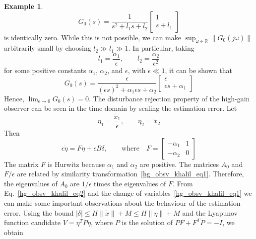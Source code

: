 \documentclass[11pt,a4paper,oneside]{book}
\numberwithin{equation}{section}
\theoremstyle{it}
\theoremstyle{definition}
\newtheorem{example}{Example}[section]
\begin{document}
\begin{example}
	\begin{equation*}
		G_0(s)=\frac{1}{s^2+l_1s+l_2}\begin{bmatrix} 1 \\[6pt] s + l_1 \end{bmatrix}
	\end{equation*} 
	is identically zero. While this is not possible, we can make $\sup_{\omega\in\mathbb{R}}\|G_0(j\omega)\|$ arbitrarily small by choosing $l_2\gg l_1\gg 1$. In particular, taking 
	\begin{equation*}
		l_1=\frac{\alpha_1}{\epsilon},\qquad l_2=\frac{\alpha_2}{\epsilon^2}
	\end{equation*}
	for some positive constants $\alpha_1$, $\alpha_2$, and $\epsilon$, with $\epsilon\ll 1$, it can be shown that 
	\begin{equation*}
		G_0(s)=\frac{\epsilon}{(\epsilon s)^2+\alpha_1\epsilon s +\alpha_2}\begin{bmatrix} \epsilon \\[6pt] \epsilon s + \alpha_1 \end{bmatrix}
	\end{equation*}
	Hence, $\lim_{\epsilon\rightarrow0}G_0(s)=0$. The disturbance rejection property of the high-gain observer can be seen in the time domain by scaling the estimation error. Let
	\begin{equation}\label{hg_obsv_khalil_eq1}
		\eta_1=\frac{\tilde{x}_1}{\epsilon},\qquad \eta_2=\tilde{x}_2
	\end{equation}
	Then
	\begin{equation}\label{hg_obsv_khalil_eq2}
		\epsilon\dot{\eta}=F\eta+\epsilon B\delta,\qquad\text{where}\quad F=\begin{bmatrix} -\alpha_1 & 1 \\[6pt] -\alpha_2 & 0 \end{bmatrix}
	\end{equation}
	The matrix $F$ is Hurwitz because $\alpha_1$ and $\alpha_2$ are positive. The matrices $A_0$ and $F/\epsilon$ are related by similarity transformation~\eqref{hg_obsv_khalil_eq1}. Therefore, the eigenvalues of $A_0$ are $1/\epsilon$ times the eigenvalues of $F$. From Eq.~\eqref{hg_obsv_khalil_eq2} and the change of variables~\eqref{hg_obsv_khalil_eq1} we can make some important observations about the behaviour of the estimation error. Using the bound $|\delta|\le H\|\tilde{x}\|+M\le H\|\eta\|+M$ and the Lyapunov function candidate $V=\eta^TP\eta$, where $P$ is the solution of $PF+F^TP=-I$, we obtain
	\begin{equation*}

\end{equation*}
\end{example}
\end{document}
